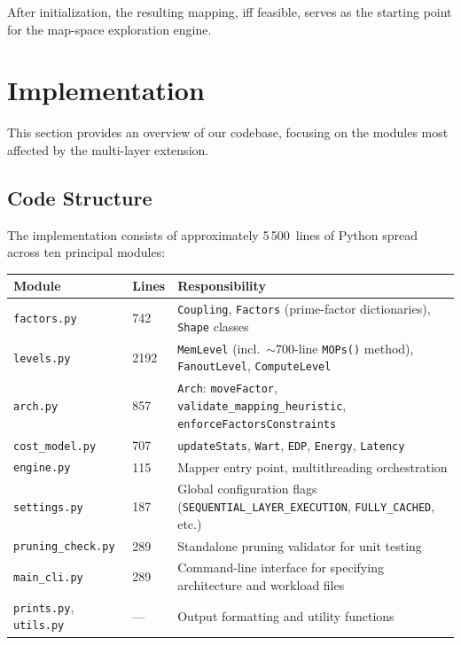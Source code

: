 \noindent
After initialization, the resulting mapping, iff feasible, serves as the starting
point for the map-space exploration engine.


\section{Implementation}
\label{sec:ps-implementation}

This section provides an overview of our codebase, focusing
on the modules most affected by the multi-layer extension.

\subsection{Code Structure}
\label{sec:ps-code-structure}

The implementation consists of approximately 5\,500~lines of Python
spread across ten principal modules:

\begin{center}
\small
\begin{tabular}{llp{7.2cm}}
  \toprule
  \textbf{Module} & \textbf{Lines} & \textbf{Responsibility} \\
  \midrule
  \texttt{factors.py}
      & 742
      & \texttt{Coupling}, \texttt{Factors} (prime-factor
        dictionaries), \texttt{Shape} classes \\
  \texttt{levels.py}
      & 2192
      & \texttt{MemLevel} (incl.\ $\sim$700-line
        \texttt{MOPs()} method), \texttt{FanoutLevel},
        \texttt{ComputeLevel} \\
  \texttt{arch.py}
      & 857
      & \texttt{Arch}: \texttt{moveFactor},
        \texttt{validate\_mapping\_heuristic},
        \texttt{enforceFactorsConstraints} \\
  \texttt{cost\_model.py}
      & 707
      & \texttt{updateStats}, \texttt{Wart}, \texttt{EDP},
        \texttt{Energy}, \texttt{Latency} \\
  \texttt{engine.py}
      & 115
      & Mapper entry point, multithreading orchestration \\
  \texttt{settings.py}
      & 187
      & Global configuration flags
        (\texttt{SEQUENTIAL\_LAYER\_EXECUTION},
        \texttt{FULLY\_CACHED}, etc.) \\
  \texttt{pruning\_check.py}& 289
      & Standalone pruning validator for unit testing \\
  \texttt{main\_cli.py}
      & 289
      & Command-line interface for specifying architecture
        and workload files \\
  \texttt{prints.py}, \texttt{utils.py}
      & ---
      & Output formatting and utility functions \\
  \bottomrule
\end{tabular}
\end{center}

